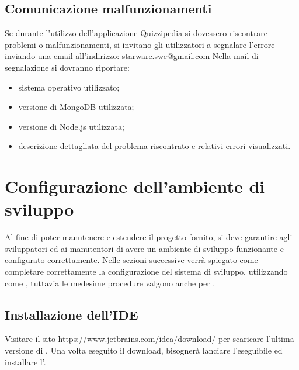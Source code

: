 \documentclass[12pt,a4paper]{article}
\begin{document}
	\subsection{Comunicazione malfunzionamenti}
		Se durante l’utilizzo dell’applicazione Quizzipedia si dovessero riscontrare problemi o
		malfunzionamenti, si invitano gli utilizzatori a segnalare l’errore inviando una email
		all’indirizzo:
		\url{starware.swe@gmail.com}
		Nella mail di segnalazione si dovranno riportare:
		\begin{itemize}
			\item sistema operativo utilizzato;
			\item versione di MongoDB utilizzata;
			\item versione di Node.js utilizzata;
			\item descrizione dettagliata del problema riscontrato e relativi errori visualizzati.
		\end{itemize}

	
	\newpage
	\section{Configurazione dell'ambiente di sviluppo}
	Al fine di poter manutenere e estendere il progetto fornito, si deve garantire agli sviluppatori ed ai manutentori di avere un ambiente di sviluppo funzionante e configurato correttamente.
	Nelle sezioni successive verrà spiegato come completare correttamente la configurazione del sistema di sviluppo, utilizzando come   , tuttavia le medesime procedure valgono anche per  .  
	
	\subsection{Installazione dell'IDE}
	Visitare il sito \url{https://www.jetbrains.com/idea/download/} per scaricare l'ultima versione di  .
	Una volta eseguito il download, bisognerà lanciare l'eseguibile ed installare l'.
	
\end{document}

